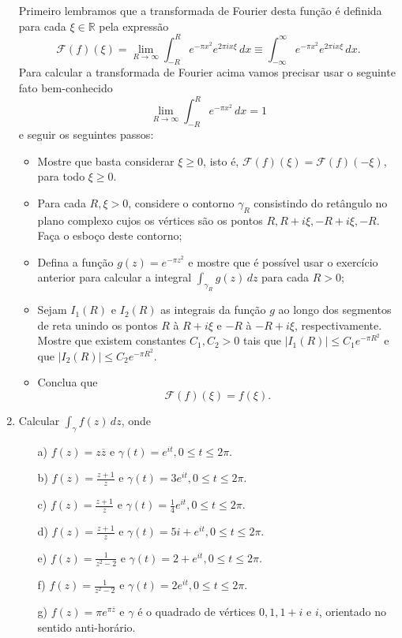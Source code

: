 \begin{enumerate}[leftmargin=*]
	Primeiro lembramos que a transformada de Fourier desta função
	é definida para cada $\xi\in\mathbb{R}$ pela expressão
	\[
	\mathcal{F}(f)(\xi)
	=
	\lim_{R\to \infty} 
	\int_{-R}^{R} e^{ -\pi x^2  } e^{ 2\pi i x\xi }\, dx
	\equiv 
	\int_{-\infty}^{\infty} e^{ -\pi x^2  } e^{ 2\pi i x\xi }\, dx.
	\]
	Para calcular a transformada de Fourier acima vamos 
	precisar usar o seguinte fato bem-conhecido
	\[
	\lim_{R\to\infty} \int_{-R}^{R} e^{-\pi x^2}\, dx = 1
	\]
	e seguir os seguintes passos:
		\begin{itemize}
			\item Mostre que basta considerar $\xi\geqslant 0$, isto é, 
			$\mathcal{F}(f)(\xi)=\mathcal{F}(f)(-\xi)$, para todo $\xi\geqslant 0$.
			
			\item Para cada $R,\xi>0$, considere o contorno $\gamma_{R}$ consistindo do 
			retângulo no plano complexo cujos os vértices são os pontos 
			$R, R+i\xi, -R+i\xi,-R$. Faça o esboço deste contorno;
			
			\item Defina a função $g(z)=e^{-\pi z^2}$ e mostre que é possível 
			usar o exercício anterior para calcular a integral 
			$\int_{\gamma_{R}} g(z)\, dz$ para cada $R>0$;
			
			\item Sejam $I_1(R)$ e $I_2(R)$ as 
			integrais da função $g$ ao longo dos segmentos de reta
			unindo os pontos $R$ à $R+i\xi$ e $-R$ à $-R+i\xi$, respectivamente.
			Mostre que existem constantes $C_1,C_2>0$ tais que 
			$|I_1(R)|\leqslant C_1 e^{-\pi R^2}$
			e que $|I_2(R)|\leqslant C_2 e^{-\pi R^2}$.
			
			\item Conclua que 
			\[\mathcal{F}(f)(\xi) = f(\xi). \]
		\end{itemize}
	
	
	\item Calcular $\int_{\gamma} f(z)\, dz$, onde
		\begin{itemize}
			\item[a)] $f(z)=z\overline{z}$ e $\gamma(t)=e^{it}, 0\leq t\leq 2\pi$.
			\item[b)] $\displaystyle f(z)=\frac{z+1}{z}$ e $\gamma(t)= 3e^{it}, 0\leq t\leq 2\pi$.
			\item[c)] $\displaystyle f(z)=\frac{z+1}{z}$ e 
						$\gamma(t) = \frac{1}{4}e^{it}, 0\leq t\leq 2\pi$.
			\item[d)] $\displaystyle f(z)=\frac{z+1}{z}$ e 
						$\gamma(t) = 5i+e^{it}, 0\leq t\leq 2\pi$.			
			\item[e)] $\displaystyle f(z)=\frac{1}{z^2-2}$ e $\gamma(t) = 2+e^{it}, 0\leq t\leq 2\pi$. 
			\item[f)] $\displaystyle f(z)=\frac{1}{z^2-2}$ e $\gamma(t) = 2e^{it}, 0\leq t\leq 2\pi$. 
			\item[g)] $\displaystyle f(z)= \pi e^{\pi\overline{z}}$ e $\gamma$ é o quadrado
						de vértices $0,1,1+i$ e $i$, orientado no sentido anti-horário.
		\end{itemize}
	


\end{enumerate}
